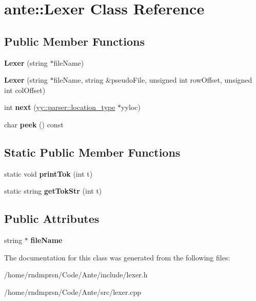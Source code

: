 \hypertarget{classante_1_1Lexer}{}\section{ante\+:\+:Lexer Class Reference}
\label{classante_1_1Lexer}
\subsection*{Public Member Functions}
\begin{DoxyCompactItemize}
\item 
\mbox{\label{classante_1_1Lexer_ad0cd11d06103a78f406294d961726ecc}} 
{\bfseries Lexer} (string $\ast$file\+Name)
\item 
\mbox{\label{classante_1_1Lexer_a5837d0d16d5a2c8d3181692920e5ed76}} 
{\bfseries Lexer} (string $\ast$file\+Name, string \&pseudo\+File, unsigned int row\+Offset, unsigned int col\+Offset)
\item 
\mbox{\label{classante_1_1Lexer_a44129a9f9c58d2f2253d98bfd5ac2ace}} 
int {\bfseries next} (\hyperlink{classyy_1_1parser_a6cee0517f5ed9774dd68ee189b62e454}{yy\+::parser\+::location\+\_\+type} $\ast$yyloc)
\item 
\mbox{\label{classante_1_1Lexer_a1b82aee0650781111ad57ddca170ffb2}} 
char {\bfseries peek} () const
\end{DoxyCompactItemize}
\subsection*{Static Public Member Functions}
\begin{DoxyCompactItemize}
\item 
\mbox{\label{classante_1_1Lexer_a93184bdb99a12886bcbdd74f43c6fdbf}} 
static void {\bfseries print\+Tok} (int t)
\item 
\mbox{\label{classante_1_1Lexer_a717d2efb1d9d90b540c3bc04c281f8ae}} 
static string {\bfseries get\+Tok\+Str} (int t)
\end{DoxyCompactItemize}
\subsection*{Public Attributes}
\begin{DoxyCompactItemize}
\item 
\mbox{\label{classante_1_1Lexer_aaad2fba05347b7d68601cf89be207e74}} 
string $\ast$ {\bfseries file\+Name}
\end{DoxyCompactItemize}


The documentation for this class was generated from the following files\+:\begin{DoxyCompactItemize}
\item 
/home/rndmprsn/\+Code/\+Ante/include/lexer.\+h\item 
/home/rndmprsn/\+Code/\+Ante/src/lexer.\+cpp\end{DoxyCompactItemize}
